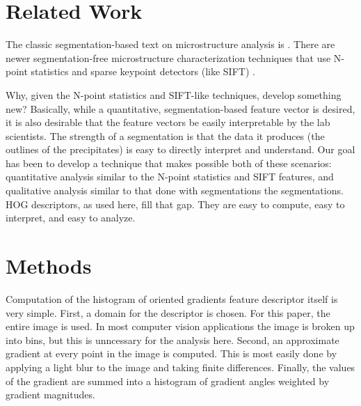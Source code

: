 \documentclass[review]{elsarticle}
\begin{document}
	\section{Related Work}\label{relatedwork}
	The classic segmentation-based text on microstructure analysis is \cite{underwood}. There are newer segmentation-free microstructure characterization techniques that use N-point statistics \cite{kalidindi1, kalidindi2} and sparse keypoint detectors (like SIFT) \cite{decost}.

	Why, given the N-point statistics and SIFT-like techniques, develop something new? Basically, while a quantitative, segmentation-based feature vector is desired, it is also desirable that the feature vectors be easily interpretable by the lab scientists. The strength of a segmentation is that the data it produces (the outlines of the precipitates) is easy to directly interpret and understand. Our goal has been to develop a technique that makes possible both of these scenarios: quantitative analysis similar to the N-point statistics and SIFT features, and qualitative analysis similar to that done with segmentations the segmentations. HOG descriptors, as used here, fill that gap. They are easy to compute, easy to interpret, and easy to analyze.
	
	
	
	

	\section{Methods}\label{methodsandmaterials}
	Computation of the histogram of oriented gradients feature descriptor itself is very simple. First, a domain for the descriptor is chosen. For this paper, the entire image is used. In most computer vision applications the image is broken up into bins, but this is unncessary for the analysis here. Second, an approximate gradient at every point in the image is computed. This is most easily done by applying a light blur to the image and taking finite differences. Finally, the values of the gradient are summed into a histogram of gradient angles weighted by gradient magnitudes.
\end{document}
